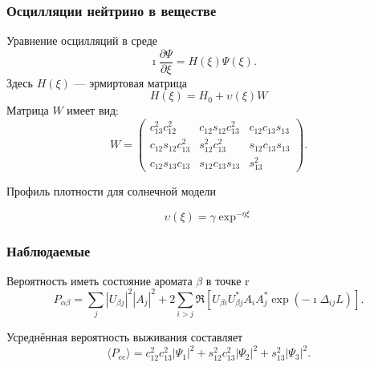 \documentclass[utf8,9pt,mathserif,usepdftitle=false]{beamer}
\begin{document}
\begin{frame}
  \frametitle{Осцилляции нейтрино в веществе}%
  Уравнение осцилляций в среде
  \begin{equation*}
  	\imath \frac{\partial \Psi}{\partial \xi}=H(\xi)\Psi(\xi).\quad
  \end{equation*}
  Здесь \({H(\xi)}\) — эрмиртовая матрица
  \begin{equation*}
  	H(\xi)=H_0+\upsilon(\xi)W
  \end{equation*}
  Матрица \(W\) имеет вид:
  \begin{equation*}
  	W=
  	\begin{pmatrix}
  		c_{13}^{2}c_{12}^{2} & c_{12}s_{12}c_{13}^{2} & c_{12}c_{13}s_{13}\\
  		c_{12}s_{12}c_{13}^{2} & s_{12}^{2}c_{13}^{2} & s_{12}c_{13}s_{13}\\
  		c_{12}s_{13}c_{13} & s_{12}c_{13}s_{13} & s_{13}^{2}
  	\end{pmatrix}.
  \end{equation*}

  Профиль плотности для солнечной модели

  \begin{equation*}
  	\upsilon(\xi)=\gamma \exp^{-\eta\xi}
  \end{equation*}
\end{frame}

\begin{frame}
  \frametitle{Наблюдаемые}%
  Вероятность иметь состояние аромата \(\beta\) в точке r
  \begin{equation*}
  	P_{\alpha\beta}=\sum_{j}|U_{\beta j}|^{2}|A_{j}|^{2}+2\sum_{i>j}\Re[U_{\beta
  	i}U_{\beta j}^{*}A_{i}A_{j}^{*}\exp(-\imath\Delta_{ij}L)].
  \end{equation*}

  Усреднённая вероятность выживания составляет
  \begin{equation*}
  	\langle P_{ee}\rangle
    =c_{12}^{2}c_{13}^{2}|\Psi_{1}|^{2}+s_{12}^{2}c_{13}^{2}|\Psi_{2}|^{2}+s_{13}^{2}|\Psi_{3}|^{2}.
  \end{equation*}
\end{frame}
\end{document}
